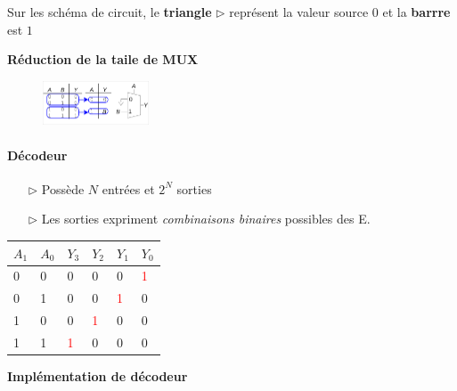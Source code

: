 \documentclass{report}
\begin{document}
\begin{multicols*}{3}
    \begin{note}{}{}
      Sur les schéma de circuit, le \textbf{triangle} $\rhd$ représent la valeur source $0$ 
        et la \textbf{barrre} est $1$  
    \end{note}

    \noindent \textbf{Réduction de la taile de MUX}  
    \begin{figure}[H]
      \begin{center}
        \includegraphics[width=0.28\textwidth]{ReductionMUX.png}
      \end{center}
    \end{figure} 

    \paragraph{Décodeur}
    \begin{itemize}
      \item [$\rhd$ ] Possède $N$ entrées et $2^N$ sorties 
      \item [$\rhd$ ] Les sorties expriment \textit{combinaisons binaires} possibles des E.    
     
    \end{itemize}


    \begin{table}[H]

      \begin{center}
        \renewcommand{\arraystretch}{1.5}
        \selectfont
        \footnotesize
            \begin{tabular}{l l l l l l}
            \arrayrulecolor{blue}\hline
            \rowcolor{lightBlue}
            \textcolor{myb}{$A_1$} & \textcolor{myb}{$A_0$} &
            \textcolor{myb}{$Y_3$} & \textcolor{myb}{$Y_2$} &
            \textcolor{myb}{$Y_1$} & \textcolor{myb}{$Y_0$} 
            \\
            \hline
            \arrayrulecolor{black}
            0 & 0 & 0 & 0 & 0 & \textcolor{red}{1}  
            \\
            \hline
            0 & 1 & 0 & 0 & \textcolor{red}{1} & 0
            \\
            \hline
            1 & 0 & 0 & \textcolor{red}{1} & 0 & 0
            \\
            \hline
            1 & 1 & \textcolor{red}{1} & 0 & 0 & 0
            \\
            \hline
                \end{tabular}
    \end{center}
    \end{table}
    \noindent \textbf{Implémentation de décodeur}  



\end{multicols*}
\end{document}
